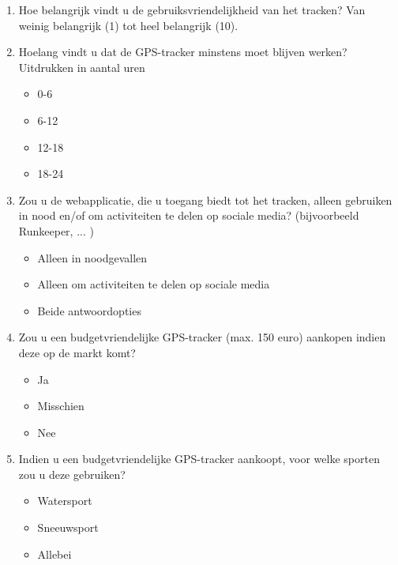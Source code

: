 \begin{enumerate}
	\item Hoe belangrijk vindt u de gebruiksvriendelijkheid van het tracken? Van weinig belangrijk (1) tot heel belangrijk (10).
	\item Hoelang vindt u dat de GPS-tracker minstens moet blijven werken? Uitdrukken in aantal uren
	\begin{itemize}
		\item 0-6
		\item 6-12
		\item 12-18
		\item 18-24
	\end{itemize}
	\item Zou u de webapplicatie, die u toegang biedt tot het tracken, alleen gebruiken in nood en/of om activiteiten te delen op sociale media? (bijvoorbeeld Runkeeper, ... )
	\begin{itemize}
		\item Alleen in noodgevallen
		\item Alleen om activiteiten te delen op sociale media
		\item Beide antwoordopties
	\end{itemize}
	\item  Zou u een budgetvriendelijke GPS-tracker (max. 150 euro) aankopen indien deze op de markt komt?
	\begin{itemize}
		\item Ja
		\item Misschien
		\item Nee
	\end{itemize}
	\item Indien u een budgetvriendelijke GPS-tracker aankoopt, voor welke sporten zou u deze gebruiken?
	\begin{itemize}
		\item Watersport
		\item Sneeuwsport
		\item Allebei
	\end{itemize}
	
\end{enumerate}